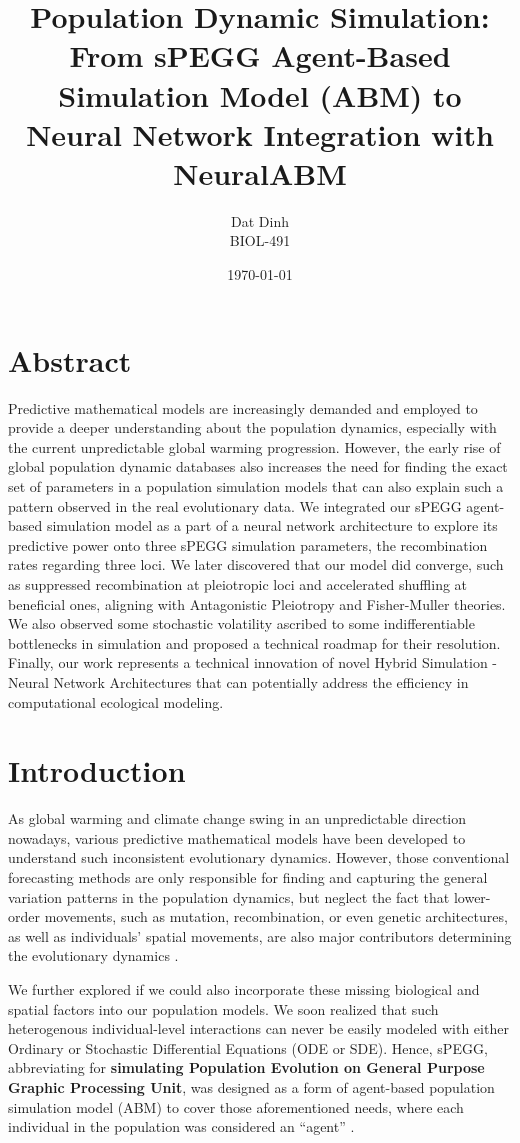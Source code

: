 \documentclass[12pt]{article}
\title{Population Dynamic Simulation: From sPEGG Agent-Based Simulation Model (ABM) to Neural Network Integration with NeuralABM}
\author{Dat Dinh \\ BIOL-491}
\date{\today}
\begin{document}
\maketitle

\section{Abstract}

Predictive mathematical models are increasingly demanded and employed to provide a deeper understanding about the population dynamics, especially with the current unpredictable global warming progression. However, the early rise of global population dynamic databases also increases the need for finding the exact set of parameters in a population simulation models that can also explain such a pattern observed in the real evolutionary data. We integrated our sPEGG agent-based simulation model as a part of a neural network architecture to explore its predictive power onto three sPEGG simulation parameters, the recombination rates regarding three loci. We later discovered that our model did converge, such as suppressed recombination at pleiotropic loci and accelerated shuffling at beneficial ones, aligning with Antagonistic Pleiotropy and Fisher-Muller theories. We also observed some stochastic volatility ascribed to some indifferentiable bottlenecks in simulation and proposed a technical roadmap for their resolution. Finally, our work represents a technical innovation of novel Hybrid Simulation - Neural Network Architectures that can potentially address the efficiency in computational ecological modeling.

\section{Introduction}
As global warming and climate change swing in an unpredictable direction nowadays, various predictive mathematical models have been developed to understand such inconsistent evolutionary dynamics. However, those conventional forecasting methods are only responsible for finding and capturing the general variation patterns in the population dynamics, but neglect the fact that lower-order movements, such as mutation, recombination, or even genetic architectures, as well as individuals' spatial movements, are also major contributors determining the evolutionary dynamics \cite{okamoto2018}.

We further explored if we could also incorporate these missing biological and spatial factors into our population models. We soon realized that such heterogenous individual-level interactions can never be easily modeled with either Ordinary or Stochastic Differential Equations (ODE or SDE). Hence, sPEGG, abbreviating for \textbf{simulating Population Evolution on General Purpose Graphic Processing Unit}, was designed as a form of agent-based population simulation model (ABM) to cover those aforementioned needs, where each individual in the population was considered an \enquote{agent} \cite{okamoto2018}.
\end{document}

